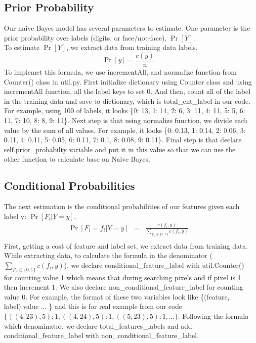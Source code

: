 \documentclass{article}
\begin{document}
    \subsection{Prior Probability}
        Our naive Bayes model has several parameters to estimate. One parameter is the prior probability over labels (digits, or face/not-face), $\Pr[Y]$.\\
        To estimate $\Pr[Y]$, we extract data from training data labels. 
        \begin{displaymath}
        \Pr[y] = \frac{c(y)}{n}
        \end{displaymath}
        To implemet this formula, we use incrementAll, and normalize function from Counter() class in util.py. First initialize dictionary using Counter class and using incrementAll function, all the label keys to set 0. And then, count all of the label in the training data and save to dictionary, which is total\_cnt\_label in our code. For example, using 100 of labels, it looks \{0: 13, 1: 14, 2: 6, 3: 11, 4: 11, 5: 5, 6: 11, 7: 10, 8: 8, 9: 11\}. Next step is that using normalize function, we divide each value by the sum of all values. For example, it looks \{0: 0.13, 1: 0.14, 2: 0.06, 3: 0.11, 4: 0.11, 5: 0.05, 6: 0.11, 7: 0.1, 8: 0.08, 9: 0.11\}.
        Final step is that declare self.prior\_probabilty variable and put it in this value so that we can use the other function to calculate base on Naive Bayes. 

    \subsection{Conditional Probabilities}
        The next estimation is the conditional probabilities of our features given each label y: $\Pr[F_i \vert Y = y]$.
        \begin{eqnarray*}
        \Pr[F_i=f_i\vert Y=y] &=& \frac{c(f_i,y)}{\sum_{f'_i\in \{0,1\}}{c(f_i,y)}} \\
        \end{eqnarray*}
        First, getting a cost of feature and label set, we extract data from training data. While extracting data, to calculate the formula in the denominator (${\sum_{f'_i\in \{0,1\}}{c(f_i,y)}}$), we declare conditional\_feature\_label with util.Counter() for counting value 1 which means that during searching pixels and if pixel is 1 then increment 1. We also declare non\_conditional\_feature\_label for counting value 0. For example, the format of these two variables look like \{(feature, label):value ... \} and this is for real example from our code $\{((4, 23), 5): 1, ((4, 24), 5): 1, ((5, 23), 5): 1,...\}$. Following the formula which denominator, we declare total\_features\_labels and add conditional\_feature\_label with non\_conditional\_feature\_label.
        
\end{document}
